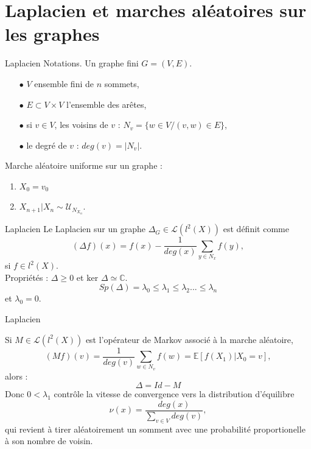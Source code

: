 \section{Laplacien et marches aléatoires sur les graphes}

\begin{frame}{Laplacien}
Notations. Un graphe fini $G=(V,E)$.
 
\begin{itemize}
\item[$\bullet$] $V$ ensemble fini de $n$ sommets,
\item[$\bullet$] $E\subset V\times V$ l'ensemble des arêtes,
\item[$\bullet$] si $v\in V$, les voisins de $v$ : $N_v=\{w\in V / (v,w)\in E\}$,
\item[$\bullet$] le degré de $v$ : $deg(v)=|N_v|$.
\end{itemize}
Marche aléatoire uniforme sur un graphe :
\begin{enumerate}
\item $X_0=v_0$
\item $X_{n+1}|X_n\sim \mathcal U_{N_{X_n}}$. \\
\end{enumerate}
\end{frame}

\begin{frame}{Laplacien}
Le Laplacien sur un graphe $\Delta_G\in \mathcal L(l^2(X))$ est définit comme
\[(\Delta f) (x) = f(x) - \frac{1}{deg(x)}\sum_{y\in N_x} f(y) ,\]
si $f\in l^2(X)$.\\

Propriétés : $\Delta\geq 0$ et $\text{ker }\Delta\simeq \mathbb C $.\\

\[Sp(\Delta)= \lambda_0\leq \lambda_1\leq \lambda_2...\leq \lambda_n\]
et $\lambda_0=0$.
\end{frame}

\begin{frame}{Laplacien}

Si $M\in\mathcal L(l^2(X))$ est l'opérateur de Markov associé à la marche aléatoire, 
\[(Mf)(v)=\frac{1}{deg(v)}\sum_{w \in N_v} f(w) = \mathbb E[f(X_1)|X_0=v],\]
alors : \[\Delta=Id-M\]
Donc $0<\lambda_1$ contrôle la vitesse de convergence vers la distribution d'équilibre
\[\nu(x)= \frac{deg(x)}{\sum_{v\in V} deg(v)},\]
qui revient à tirer aléatoirement un somment avec une probabilité proportionelle à son nombre de voisin.
\end{frame}

